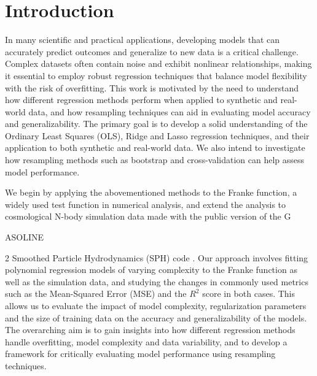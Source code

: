 \documentclass[aps,pra,english,notitlepage,reprint,nofootinbib]{revtex4-1}  %
\begin{document}
\section{Introduction}\label{sec:introduction}
In many scientific and practical applications, developing models that can accurately predict outcomes and generalize to new data is a critical challenge. Complex datasets often contain noise and exhibit nonlinear relationships, making it essential to employ robust regression techniques that balance model flexibility with the risk of overfitting. This work is motivated by the need to understand how different regression methods perform when applied to synthetic and real-world data, and how resampling techniques can aid in evaluating model accuracy and generalizability. The primary goal is to develop a solid understanding of the Ordinary Least Squares (OLS), Ridge and Lasso regression techniques, and their application to both synthetic and real-world data. We also intend to investigate how resampling methods such as bootstrap and cross-validation can help assess model performance.

We begin by applying the abovementioned methods to the Franke function, a widely used test function in numerical analysis, and extend the analysis to cosmological N-body simulation data made with the public version of the G\begin{scriptsize}ASOLINE\end{scriptsize}2 Smoothed Particle Hydrodynamics (SPH) code \cite{gasoline}. Our approach involves fitting polynomial regression models of varying complexity to the Franke function as well as the simulation data, and studying the changes in commonly used metrics such as the Mean-Squared Error (MSE) and the $R^2$ score in both cases. This allows us to evaluate the impact of model complexity, regularization parameters and the size of training data on the accuracy and generalizability of the models. The overarching aim is to gain insights into how different regression methods handle overfitting, model complexity and data variability, and to develop a framework for critically evaluating model performance using resampling techniques. 
\end{document}
